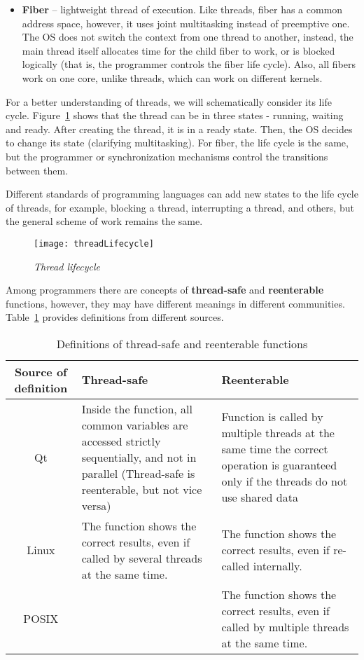 {\begin{itemize}
			\item\textbf{Fiber} -- lightweight thread of execution. Like threads, fiber has a common address space, however, it uses joint multitasking instead of preemptive one. The OS does not switch the context from one thread to another, instead, the main thread itself allocates time for the child fiber to work, or is blocked logically (that is, the programmer controls the fiber life cycle). Also, all fibers work on one core, unlike threads, which can work on different kernels.
		\end{itemize}
	\par For a better understanding of threads, we will schematically consider its life cycle. Figure~\ref{threadLifecycle:image} shows that the thread can be in three states - running, waiting and ready. After creating the thread, it is in a ready state. Then, the OS decides to change its state (clarifying multitasking). For fiber, the life cycle is the same, but the programmer or synchronization mechanisms control the transitions between them.
	\par Different standards of programming languages can add new states to the life cycle of threads, for example, blocking a thread, interrupting a thread, and others, but the general scheme of work remains the same.
		\begin{figure}[H]
			\texttt{[image: threadLifecycle]}
			\caption{\textit{Thread lifecycle}}
			\label{threadLifecycle:image}
		\end{figure}
	\par Among programmers there are concepts of \textbf{thread-safe} and \textbf{reenterable} functions, however, they may have different meanings in different communities. Table~\ref{threadSafeReentrant:table} provides definitions from different sources.
	\begin{table}[H]
		\caption{Definitions of thread-safe and reenterable functions}
		\label{threadSafeReentrant:table}
		\begin{center}
			\begin{tabularx} {\textwidth} { |c|X|X| }
				\hline 
		\textbf{	Source of definition}	& \textbf{Thread-safe} & \textbf{Reenterable} \\ 
				\hline 
				Qt & Inside the function, all common variables are accessed strictly sequentially, and not in parallel (Thread-safe is reenterable, but not vice versa)  &  Function is called by multiple threads at the same time the correct operation is guaranteed only if the threads do not use shared data \\ 
				\hline 
			Linux	&  The function shows the correct results, even if called by several threads at the same time. & The function shows the correct results, even if re-called internally. \\ 
				\hline
			POSIX	& \center{ ? } & The function shows the correct results, even if called by multiple threads at the same time. \\ 
				\hline 
			\end{tabularx} 


\end{center}
\end{table}}
